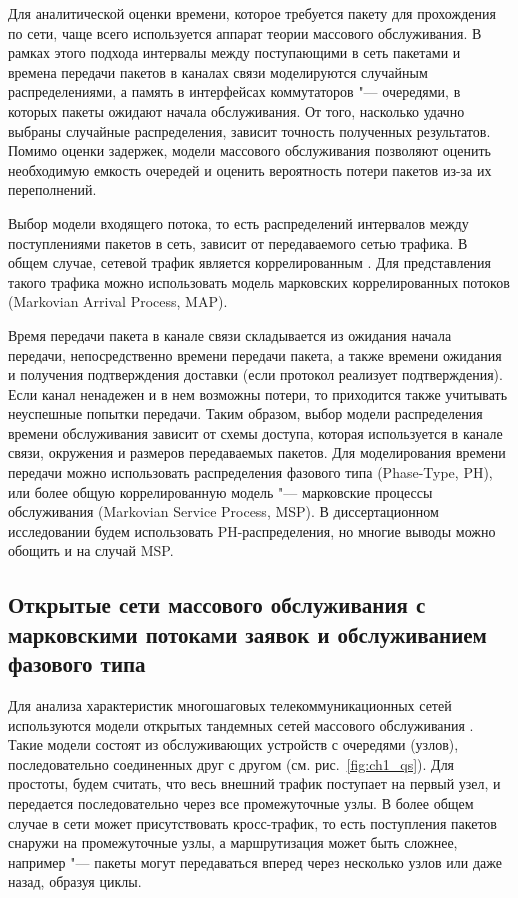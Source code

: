 Для аналитической оценки времени, которое требуется пакету для прохождения по сети, чаще всего используется аппарат теории массового обслуживания. В рамках этого подхода интервалы между поступающими в сеть пакетами и времена передачи пакетов в каналах связи моделируются случайным распределениями, а память в интерфейсах коммутаторов "--- очередями, в которых пакеты ожидают начала обслуживания. От того, насколько удачно выбраны случайные распределения, зависит точность полученных результатов. Помимо оценки задержек, модели массового обслуживания позволяют оценить необходимую емкость очередей и оценить вероятность потери пакетов из-за их переполнений.

Выбор модели входящего потока, то есть распределений интервалов между поступлениями пакетов в сеть, зависит от передаваемого сетью трафика. В общем случае, сетевой трафик является коррелированным \cite{Heyman2003, Klemm2003}. Для представления такого трафика можно использовать модель марковских коррелированных потоков (Markovian Arrival Process, MAP).

Время передачи пакета в канале связи складывается из ожидания начала передачи, непосредственно времени передачи пакета, а также времени ожидания и получения подтверждения доставки (если протокол реализует подтверждения). Если канал ненадежен и в нем возможны потери, то приходится также учитывать неуспешные попытки передачи. Таким образом, выбор модели распределения времени обслуживания зависит от схемы доступа, которая используется в канале связи, окружения и размеров передаваемых пакетов. Для моделирования времени передачи можно использовать распределения фазового типа (Phase-Type, PH), или более общую коррелированную модель "--- марковские процессы обслуживания (Markovian Service Process, MSP). В диссертационном исследовании будем использовать PH-распределения, но многие выводы можно обощить и на случай MSP.


\subsection{Открытые сети массового обслуживания с марковскими потоками заявок и обслуживанием фазового типа}
\label{sec:ch1_qs_map_ph}

Для анализа характеристик многошаговых телекоммуникационных сетей используются модели открытых тандемных сетей массового обслуживания \cite{Vishnevskii2017, VishnevskyDudin2018}. Такие модели состоят из обслуживающих устройств с очередями (узлов), последовательно соединенных друг с другом (см. рис.~\ref{fig:ch1_qs}). Для простоты, будем считать, что весь внешний трафик поступает на первый узел, и передается последовательно через все промежуточные узлы. В более общем случае в сети может присутствовать кросс-трафик, то есть поступления пакетов снаружи на промежуточные узлы, а маршрутизация может быть сложнее, например "--- пакеты могут передаваться вперед через несколько узлов или даже назад, образуя циклы.

